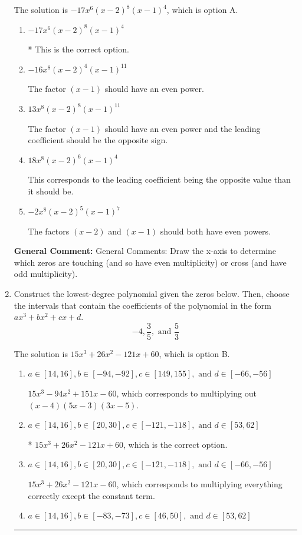 \documentclass{extbook}[14pt]
\newcommand{\litem}[1]{\item #1

\rule{\textwidth}{0.4pt}}
\begin{document}
\begin{enumerate}
{The solution is \( -17x^{6} (x - 2)^{8} (x - 1)^{4} \), which is option A.\begin{enumerate}[label=\Alph*.]
\item \( -17x^{6} (x - 2)^{8} (x - 1)^{4} \)

* This is the correct option.
\item \( -16x^{8} (x - 2)^{4} (x - 1)^{11} \)

The factor $(x - 1)$ should have an even power.
\item \( 13x^{8} (x - 2)^{8} (x - 1)^{11} \)

The factor $(x - 1)$ should have an even power and the leading coefficient should be the opposite sign.
\item \( 18x^{8} (x - 2)^{6} (x - 1)^{4} \)

This corresponds to the leading coefficient being the opposite value than it should be.
\item \( -2x^{8} (x - 2)^{5} (x - 1)^{7} \)

The factors $(x - 2)$ and $(x - 1)$ should both have even powers.
\end{enumerate}

\textbf{General Comment:} General Comments: Draw the x-axis to determine which zeros are touching (and so have even multiplicity) or cross (and have odd multiplicity).
}
\litem{
Construct the lowest-degree polynomial given the zeros below. Then, choose the intervals that contain the coefficients of the polynomial in the form $ax^3+bx^2+cx+d$.
\[ -4, \frac{3}{5}, \text{ and } \frac{5}{3} \]

The solution is \( 15x^{3} +26 x^{2} -121 x + 60 \), which is option B.\begin{enumerate}[label=\Alph*.]
\item \( a \in [14, 16], b \in [-94, -92], c \in [149, 155], \text{ and } d \in [-66, -56] \)

$15x^{3} -94 x^{2} +151 x -60$, which corresponds to multiplying out $(x -4)(5x -3)(3x -5)$.
\item \( a \in [14, 16], b \in [20, 30], c \in [-121, -118], \text{ and } d \in [53, 62] \)

* $15x^{3} +26 x^{2} -121 x + 60$, which is the correct option.
\item \( a \in [14, 16], b \in [20, 30], c \in [-121, -118], \text{ and } d \in [-66, -56] \)

$15x^{3} +26 x^{2} -121 x -60$, which corresponds to multiplying everything correctly except the constant term.
\item \( a \in [14, 16], b \in [-83, -73], c \in [46, 50], \text{ and } d \in [53, 62] \)


\end{enumerate}}
\end{enumerate}
\end{document}
